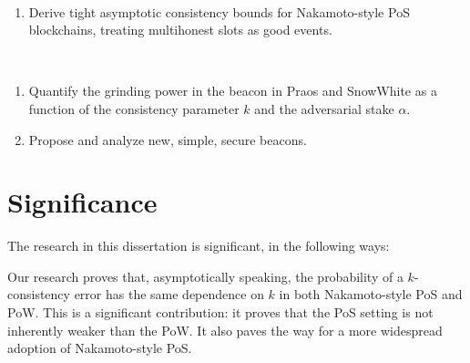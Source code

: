 \begin{description}[font=\normalfont\itshape\space]
  \item[Consistency Problem:]~
  \begin{enumerate}
    \item Derive tight asymptotic consistency bounds for Nakamoto-style PoS blockchains, 
    treating multihonest slots as good events.

    \setcounter{ConsistencyObjectives}{\value{enumi}}
  \end{enumerate}

  \item[Grinding Problem:]~
  \begin{enumerate}
    \setcounter{enumi}{\value{ConsistencyObjectives}}

    \item Quantify the grinding power in the beacon in Praos and SnowWhite 
    as a function of the consistency parameter $k$ and the adversarial stake $\alpha$.
    
    \item Propose and analyze new, simple, secure beacons.
  \end{enumerate}
\end{description}





\section{Significance}



The research in this dissertation is significant, in the following ways:

  Our research proves that, asymptotically speaking, the probability of a $k$-consistency error 
  has the same dependence on $k$ in both Nakamoto-style PoS and PoW. 
  This is a significant contribution: 
  it proves that the PoS setting is not inherently weaker than the PoW. 
  It also paves the way for a more widespread adoption of Nakamoto-style PoS.

